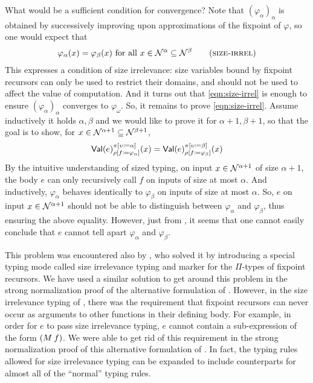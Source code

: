 What would be a sufficient condition for convergence?
%
Note that $(\varphi_\alpha)_\alpha$ is obtained by successively
improving upon approximations of the fixpoint of $\varphi$, so one
would expect that
%
\begin{align*}
  \varphi_\alpha(x) = \varphi_\beta(x) \text{ for all } x \in \McN^\alpha \subseteq \McN^\beta
  \label{eqn:size-irrel}\tag{\textsc{size-irrel}}
\end{align*}
%
This expresses a condition of size irrelevance: size variables bound
by fixpoint recursors can only be used to restrict their domains, and
should not be used to affect the value of computation.
%
And it turns out that \eqref{eqn:size-irrel} is enough to ensure
$(\varphi_\alpha)_\alpha$ converges to $\varphi_\omega$.
%
So, it remains to prove \eqref{eqn:size-irrel}.
%
Assume inductively it holds $\alpha,\beta$ and we would like to prove
it for $\alpha+1,\beta+1$, so that the goal is to show, for
$x \in \mathcal{N}^{\alpha+1} \subseteq \mathcal{N}^{\beta+1}$,
%
\begin{align*}
  \textsf{Val}(e)_{\rho [f \coloneqq \varphi_\alpha]}^{\pi [\upsilon \coloneqq \alpha]}(x) =
  \textsf{Val}(e)_{\rho [f \coloneqq \varphi_\beta]}^{\pi [\upsilon \coloneqq \beta]}(x)
\end{align*}
%
By the intuitive understanding of sized typing, on input
$x \in \mathcal{N}^{\alpha+1}$ of size $\alpha+1$, the body $e$ can only
recursively call $f$ on inputs of size at most $\alpha$.
%
And inductively, $\varphi_\alpha$ behaves identically to
$\varphi_\beta$ on inputs of size at most $\alpha$.
%
So, $e$ on input $x \in \mathcal{N}^{\alpha+1}$ should not be able to
distinguish between $\varphi_\alpha$ and $\varphi_\beta$, thus
ensuring the above equality.
%
However, just from , it seems that one cannot
easily conclude that $e$ cannot tell apart $\varphi_\alpha$ and
$\varphi_\beta$.

This problem was encountered also by \citet{barras-thesis}, who solved
it by introducing a special typing mode called size irrelevance typing
and marker for the $\Pi$-types of fixpoint recursors.
%
We have used a similar solution to get around this problem in the
strong normalization proof of the alternative formulation of \lang.
%
However, in the size irrelevance typing of \citet{barras-thesis},
there was the requirement that fixpoint recursors can never occur as
arguments to other functions in their defining body.
%
For example, in order for $e$ to pass size irrelevance typing, $e$
cannot contain a sub-expression of the form $(\app{M}{f})$.
%
%
We were able to get rid of this requirement in the strong
normalization proof of this alternative formulation of \lang.
%
In fact, the typing rules allowed for size irrelevance typing can be
expanded to include counterparts for almost all of the ``normal''
typing rules.

